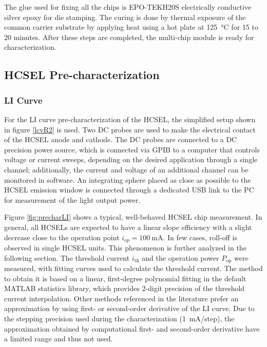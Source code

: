 The glue used for fixing all the chips is EPO-TEK\circledR H20S electrically conductive silver epoxy for die stamping. The curing is done by thermal exposure of the common carrier substrate by applying heat using a hot plate at \SI{125}{\celsius} for 15 to 20 minutes. After these steps are completed, the multi-chip module is ready for characterization.

\subsection{HCSEL Pre-characterization}

\subsubsection{LI Curve}

For the LI curve pre-characterization of the HCSEL, the simplified setup shown in figure \ref{lcvR2} is used. Two DC probes are used to make the electrical contact of the HCSEL anode and cathode. The DC probes are connected to a DC precision power source, which is connected via GPIB to a computer that controls voltage or current sweeps, depending on the desired application through a single channel; additionally, the current and voltage of an additional channel can be monitored in software. An integrating sphere placed as close as possible to the HCSEL emission window is connected through a dedicated USB link to the PC for measurement of the light output power.  


Figure \ref{fig:precharLI} shows a typical, well-behaved HCSEL chip measurement. In general, all HCSELs are expected to have a linear slope efficiency with a slight decrease close to the operation point $i_{op}=\SI{100}{\milli\ampere}$. In few cases, roll-off is observed in single HCSEL units. This phenomenon is further analyzed in the following section. The threshold current $i_\text{th}$ and the operation power $P_\text{op}$ were measured, with fitting curves used to calculate the threshold current. The method to obtain it is based on a linear, first-degree polynomial fitting in the default MATLAB statistics library, which provides 2-digit precision of the threshold current interpolation. Other methods referenced in the literature \cite{HerstensLDchar05} prefer an approximation by using first- or second-order derivative of the LI curve. Due to the stepping precision used during the characterization (\SI{1}{\milli\ampere}/step), the approximation obtained by computational first- and second-order derivative have a limited range and thus not used.

